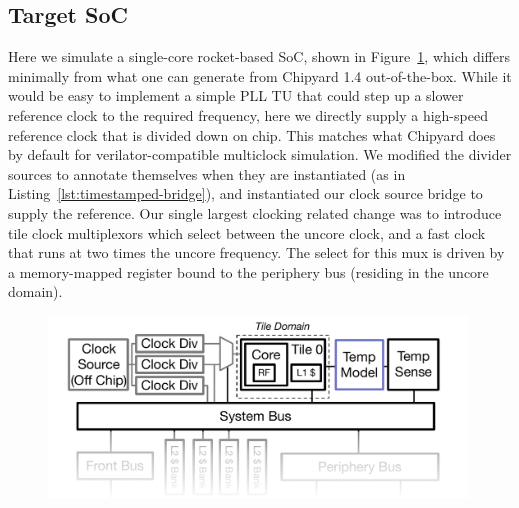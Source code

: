 \subsection{Target SoC}
Here we simulate a single-core rocket-based SoC, shown in
Figure~\ref{fig:pdes-demo-target}, which differs minimally from what one can
generate from Chipyard 1.4 out-of-the-box. While it would be easy to implement
a simple PLL TU that could step up a slower reference clock to the required
frequency, here we directly supply a high-speed reference clock that is
divided down on chip. This matches what Chipyard does by default for
verilator-compatible multiclock simulation. We modified the divider sources to
annotate themselves when they are instantiated (as in
Listing~\ref{lst:timestamped-bridge}), and instantiated our clock source bridge
to supply the reference. Our single largest clocking related change was to introduce tile clock multiplexors which select
between the uncore clock, and a fast clock that runs at two times the uncore frequency. The select for this mux is driven
by a memory-mapped register bound to the periphery bus (residing in the uncore domain).

\begin{figure}
    \centering
    \includegraphics[width=0.99\textwidth]{figures/pdes-demo-target.pdf}
    \caption{}
    \label{fig:pdes-demo-target}
\end{figure}

